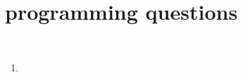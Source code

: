 \section{programming questions}

\begin{lstlisting}


\end{lstlisting}

\begin{enumerate}[label=(\arabic*)]
  \item
\end{enumerate}
